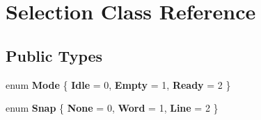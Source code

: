 \hypertarget{classSelection}{}\section{Selection Class Reference}
\label{classSelection}
\subsection*{Public Types}
\begin{DoxyCompactItemize}
\item 
\mbox{\label{classSelection_a99957eb9d95f562b3845f73b2541ff3d}} 
enum {\bfseries Mode} \{ {\bfseries Idle} = 0, 
{\bfseries Empty} = 1, 
{\bfseries Ready} = 2
 \}
\item 
\mbox{\label{classSelection_acfe2feef8ee69c57d927872359f13e90}} 
enum {\bfseries Snap} \{ {\bfseries None} = 0, 
{\bfseries Word} = 1, 
{\bfseries Line} = 2
 \}
\end{DoxyCompactItemize}
